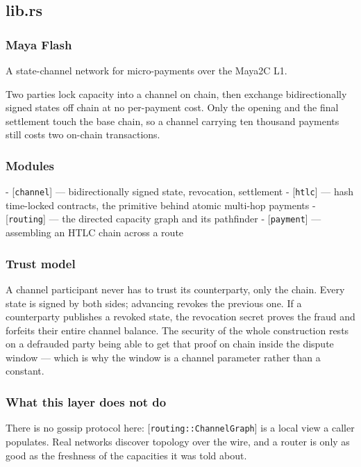 \documentclass[11pt,a4paper]{article}
\begin{document}
\subsection{lib.rs}
\subsubsection{Maya Flash}

A state-channel network for micro-payments over the Maya2C L1.

Two parties lock capacity into a channel on chain, then exchange
bidirectionally signed states off chain at no per-payment cost. Only the
opening and the final settlement touch the base chain, so a channel carrying
ten thousand payments still costs two on-chain transactions.

\subsubsection{Modules}

- [\texttt{channel}] — bidirectionally signed state, revocation, settlement
- [\texttt{htlc}] — hash time-locked contracts, the primitive behind atomic
  multi-hop payments
- [\texttt{routing}] — the directed capacity graph and its pathfinder
- [\texttt{payment}] — assembling an HTLC chain across a route

\subsubsection{Trust model}

A channel participant never has to trust its counterparty, only the chain.
Every state is signed by both sides; advancing revokes the previous one. If a
counterparty publishes a revoked state, the revocation secret proves the
fraud and forfeits their entire channel balance. The security of the whole
construction rests on a defrauded party being able to get that proof on chain
inside the dispute window — which is why the window is a channel parameter
rather than a constant.

\subsubsection{What this layer does not do}

There is no gossip protocol here: [\texttt{routing::ChannelGraph}] is a local view a
caller populates. Real networks discover topology over the wire, and a router
is only as good as the freshness of the capacities it was told about.
\end{document}
